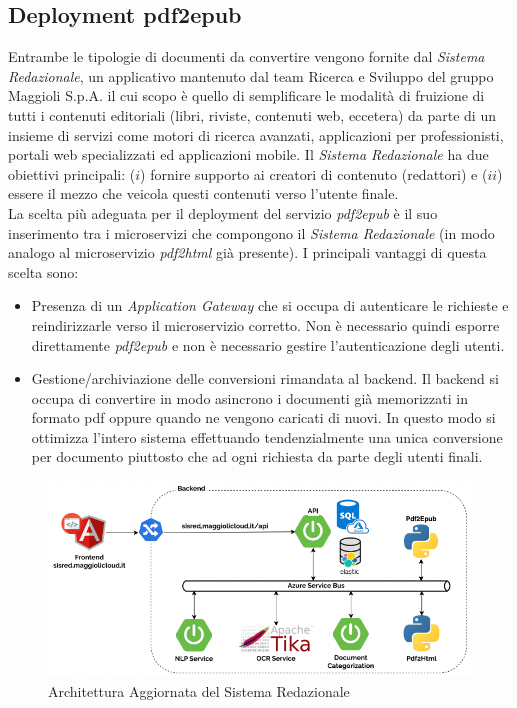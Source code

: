 \subsection{Deployment pdf2epub}
Entrambe le tipologie di documenti da convertire vengono fornite dal \textit{Sistema Redazionale}, un applicativo mantenuto dal team Ricerca e Sviluppo del gruppo Maggioli S.p.A. il cui scopo è quello di semplificare le modalità di fruizione di tutti i contenuti editoriali (libri, riviste, contenuti web, eccetera) da parte di un insieme di servizi come motori di ricerca avanzati, applicazioni per professionisti, portali web specializzati ed applicazioni mobile. Il \textit{Sistema Redazionale} ha due obiettivi principali: ($i$) fornire supporto ai creatori di contenuto (redattori) e ($ii$) essere il mezzo che veicola questi contenuti verso l’utente finale\cite{amslaurea23043}.\\
La scelta più adeguata per il deployment del servizio \textit{pdf2epub} è il suo inserimento tra i microservizi che compongono il \textit{Sistema Redazionale} (in modo analogo al microservizio \textit{pdf2html} già presente). I principali vantaggi di questa scelta sono:
\begin{itemize}
    \item Presenza di un \textit{Application Gateway} che si occupa di autenticare le richieste e reindirizzarle verso il microservizio corretto. Non è necessario quindi esporre direttamente \textit{pdf2epub} e non è necessario gestire l'autenticazione degli utenti.
    \item Gestione/archiviazione delle conversioni rimandata al backend. Il backend si occupa di convertire in modo asincrono i documenti già memorizzati in formato pdf oppure quando ne vengono caricati di nuovi. In questo modo si ottimizza l'intero sistema effettuando tendenzialmente una unica conversione per documento piuttosto che ad ogni richiesta da parte degli utenti finali.
\end{itemize}
\begin{figure}[H]
\centering
\includegraphics[width=1\textwidth]{img/tesi-7-sisred.drawio.png}
\caption{Architettura Aggiornata del Sistema Redazionale}
\end{figure}